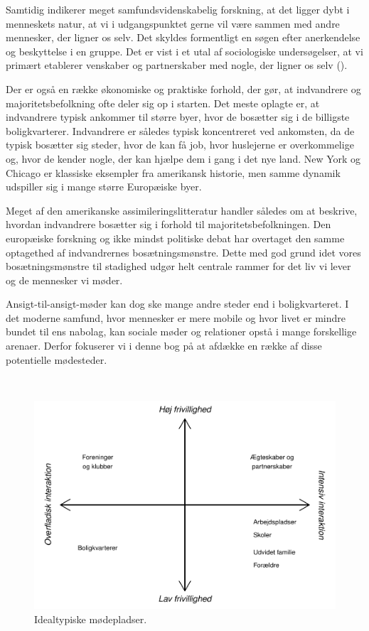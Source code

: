 \documentclass[
]{book}
\begin{document}
Samtidig indikerer meget samfundsvidenskabelig forskning, at det ligger dybt i menneskets natur, at vi i udgangspunktet gerne vil være sammen med andre mennesker, der ligner os selv. Det skyldes formentligt en søgen efter anerkendelse og beskyttelse i en gruppe. Det er vist i et utal af sociologiske undersøgelser, at vi primært etablerer venskaber og partnerskaber med nogle, der ligner os selv ().

Der er også en række økonomiske og praktiske forhold, der gør, at indvandrere og majoritetsbefolkning ofte deler sig op i starten. Det meste oplagte er, at indvandrere typisk ankommer til større byer, hvor de bosætter sig i de billigste boligkvarterer. Indvandrere er således typisk koncentreret ved ankomsten, da de typisk bosætter sig steder, hvor de kan få job, hvor huslejerne er overkommelige og, hvor de kender nogle, der kan hjælpe dem i gang i det nye land. New York og Chicago er klassiske eksempler fra amerikansk historie, men samme dynamik udspiller sig i mange større Europæiske byer.

Meget af den amerikanske assimileringslitteratur handler således om at beskrive, hvordan indvandrere bosætter sig i forhold til majoritetsbefolkningen. Den europæiske forskning og ikke mindst politiske debat har overtaget den samme optagethed af indvandrernes bosætningsmønstre. Dette med god grund idet vores bosætningsmønstre til stadighed udgør helt centrale rammer for det liv vi lever og de mennesker vi møder.

Ansigt-til-ansigt-møder kan dog ske mange andre steder end i boligkvarteret. I det moderne samfund, hvor mennesker er mere mobile og hvor livet er mindre bundet til ens nabolag, kan sociale møder og relationer opstå i mange forskellige arenaer. Derfor fokuserer vi i denne bog på at afdække en række af disse potentielle mødesteder.

~~

\begin{figure}
\includegraphics[width=1\linewidth]{en-befolkning-blander-sig_files/figure-latex/fig-1-1-1} \caption{Idealtypiske mødepladser.}\label{fig:fig-1-1}
\end{figure}
\end{document}

